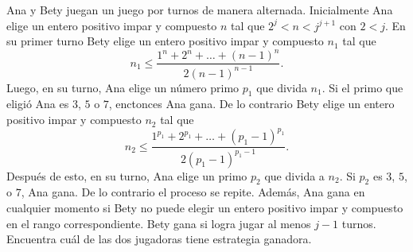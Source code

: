 Ana y Bety juegan un juego por turnos de manera alternada. Inicialmente Ana elige un entero positivo impar y compuesto $n$ tal que $2^j\lt n\lt j^{j+1}$ con $2\lt j$. En su primer turno Bety elige un entero positivo impar y compuesto $n_1$ tal que \[n_1\leq \frac{1^n+2^n+\dots+(n-1)^n}{2(n-1)^{n-1}}.\]
Luego, en su turno, Ana elige un número primo $p_1$ que divida $n_1$. Si el primo que eligió Ana es $3$, $5$ o $7$, enctonces Ana gana. De lo contrario Bety elige un entero positivo impar y compuesto $n_2$ tal que 
\[n_2\leq \frac{1^{p_1}+2^{p_1}+\dots+(p_1-1)^{p_1}}{2(p_1-1)^{p_1-1}}.\]
Después de esto, en su turno, Ana elige un primo $p_2$ que divida a $n_2$. Si $p_2$ es $3$, $5$, o $7$, Ana gana. De lo contrario el proceso se repite. Además, Ana gana en cualquier momento si Bety no puede elegir un entero positivo impar y compuesto en el rango correspondiente. Bety gana si logra jugar al menos $j-1$ turnos. Encuentra cuál de las dos jugadoras tiene estrategia ganadora.